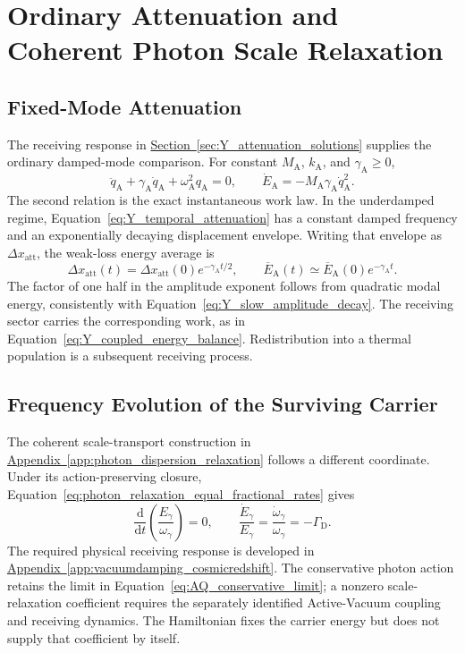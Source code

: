 \section{Ordinary Attenuation and Coherent Photon Scale Relaxation}

\subsection{Fixed-Mode Attenuation}

The receiving response in \hyperref[sec:Y_attenuation_solutions]{Section~\ref*{sec:Y_attenuation_solutions}} supplies the ordinary damped-mode comparison. For constant $M_{\mathrm A}$, $k_{\mathrm A}$, and $\gamma_{\mathrm A}\geq0$,
\begin{equation}
    \ddot q_{\mathrm A}+\gamma_{\mathrm A}\dot q_{\mathrm A}
    +\omega_{\mathrm A}^{2}q_{\mathrm A}=0,
    \qquad
    \dot E_{\mathrm A}
    =-M_{\mathrm A}\gamma_{\mathrm A}\dot q_{\mathrm A}^{2}.
\end{equation}
The second relation is the exact instantaneous work law. In the underdamped regime, Equation~\eqref{eq:Y_temporal_attenuation} has a constant damped frequency and an exponentially decaying displacement envelope. Writing that envelope as $\Delta x_{\mathrm{att}}$, the weak-loss energy average is
\begin{equation}
    \Delta x_{\mathrm{att}}(t)
    =\Delta x_{\mathrm{att}}(0)e^{-\gamma_{\mathrm A}t/2},
    \qquad
    \overline E_{\mathrm A}(t)
    \simeq\overline E_{\mathrm A}(0)e^{-\gamma_{\mathrm A}t}.
\end{equation}
The factor of one half in the amplitude exponent follows from quadratic modal energy, consistently with Equation~\eqref{eq:Y_slow_amplitude_decay}. The receiving sector carries the corresponding work, as in Equation~\eqref{eq:Y_coupled_energy_balance}. Redistribution into a thermal population is a subsequent receiving process.

\subsection{Frequency Evolution of the Surviving Carrier}

The coherent scale-transport construction in \hyperref[app:photon_dispersion_relaxation]{Appendix~\ref*{app:photon_dispersion_relaxation}} follows a different coordinate. Under its action-preserving closure, Equation~\eqref{eq:photon_relaxation_equal_fractional_rates} gives
\begin{equation}
    \frac{\mathrm d}{\mathrm dt}
    \left(\frac{E_\gamma}{\omega_\gamma}\right)=0,
    \qquad
    \frac{\dot E_\gamma}{E_\gamma}
    =\frac{\dot\omega_\gamma}{\omega_\gamma}
    =-\Gamma_{\mathrm D}.
\end{equation}
The required physical receiving response is developed in \hyperref[app:vacuumdamping_cosmicredshift]{Appendix~\ref*{app:vacuumdamping_cosmicredshift}}. The conservative photon action retains the limit in Equation~\eqref{eq:AQ_conservative_limit}; a nonzero scale-relaxation coefficient requires the separately identified Active-Vacuum coupling and receiving dynamics. The Hamiltonian fixes the carrier energy but does not supply that coefficient by itself.

